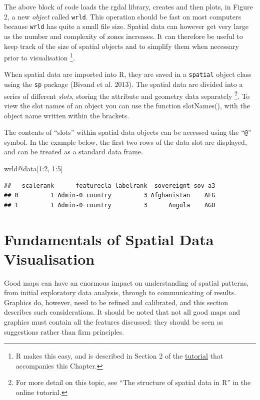 \documentclass[]{article}
\newenvironment{Shaded}{}{}
\newcommand{\DecValTok}[1]{\textcolor[rgb]{0.25,0.63,0.44}{{#1}}}
\newcommand{\NormalTok}[1]{{#1}}
\begin{document}
The above block of code loads the rgdal library, creates and then plots, in Figure 2, a new
\emph{object} called \texttt{wrld}. This operation should be fast on most computers because
\texttt{wrld} has quite a small file size. Spatial data can however get very large as the number and complexity of zones increases. It can therefore be useful to keep track of the size of spatial objects and to
simplify them when necessary prior to visualisation \footnote{R makes this easy, and is described in Section
2 of the
\href{https://github.com/geocomPP/sdvwR/blob/master/sdv-tutorial.pdf?raw=true}{tutorial}
that accompanies this Chapter.
}.

When spatial data are imported into R, they are saved in a
\texttt{spatial} object class using the \texttt{sp} package (Bivand et al.
2013). The spatial data are divided into a series of different
\emph{slots}, storing the attribute and geometry data separately \footnote{For more detail on this
topic, see ``The structure of spatial data in R'' in the online
tutorial.}. To view the slot names of an object you can use the function slotNames(), with the object name written within the brackets.

The contents of ``slots'' within spatial data objects can be accessed using the ``\texttt{@}'' symbol. In the example below, the first two rows of the data slot are displayed, and can be treated as a standard data frame.


\begin{Shaded}
\begin{Highlighting}[]
\NormalTok{wrld@data[}\DecValTok{1}\NormalTok{:}\DecValTok{2}\NormalTok{, }\DecValTok{1}\NormalTok{:}\DecValTok{5}\NormalTok{]}
\end{Highlighting}
\end{Shaded}
\begin{verbatim}
##   scalerank      featurecla labelrank  sovereignt sov_a3
## 0         1 Admin-0 country         3 Afghanistan    AFG
## 1         1 Admin-0 country         3      Angola    AGO
\end{verbatim}

\section{Fundamentals of Spatial Data Visualisation}

Good maps can have an enormous impact on understanding of spatial patterns, 
from initial exploratory data analysis, through to communicating of results.
Graphics do, however, need to be refined and calibrated, and this section describes
such considerations. It should be
noted that not all good maps and graphics must
contain all the features discussed: they should be seen as suggestions
rather than firm principles.
\end{document}
